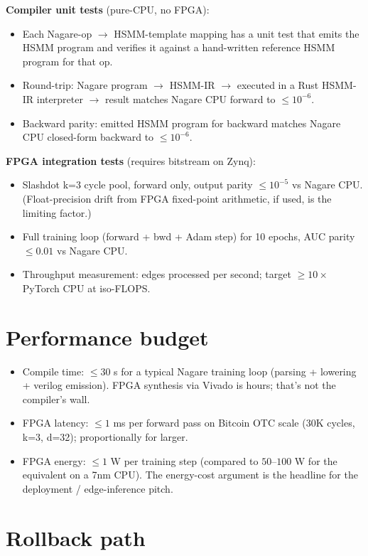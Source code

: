\documentclass[11pt]{article}
\begin{document}
\textbf{Compiler unit tests} (pure-CPU, no FPGA):
\begin{itemize}
  \item Each Nagare-op $\to$ HSMM-template mapping has a unit
    test that emits the HSMM program and verifies it against a
    hand-written reference HSMM program for that op.
  \item Round-trip: Nagare program $\to$ HSMM-IR $\to$ executed
    in a Rust HSMM-IR interpreter $\to$ result matches Nagare
    CPU forward to $\le 10^{-6}$.
  \item Backward parity: emitted HSMM program for backward
    matches Nagare CPU closed-form backward to $\le 10^{-6}$.
\end{itemize}

\textbf{FPGA integration tests} (requires bitstream on Zynq):
\begin{itemize}
  \item Slashdot k=3 cycle pool, forward only, output parity
    $\le 10^{-5}$ vs Nagare CPU. (Float-precision drift from FPGA
    fixed-point arithmetic, if used, is the limiting factor.)
  \item Full training loop (forward + bwd + Adam step) for 10
    epochs, AUC parity $\le 0.01$ vs Nagare CPU.
  \item Throughput measurement: edges processed per second; target
    $\ge 10\times$ PyTorch CPU at iso-FLOPS.
\end{itemize}

\section{Performance budget}

\begin{itemize}
  \item Compile time: $\le 30$ s for a typical Nagare training
    loop (parsing + lowering + verilog emission). FPGA synthesis
    via Vivado is hours; that's not the compiler's wall.
  \item FPGA latency: $\le 1$ ms per forward pass on Bitcoin OTC
    scale (30K cycles, k=3, d=32); proportionally for larger.
  \item FPGA energy: $\le 1$ W per training step (compared to
    $50$--$100$ W for the equivalent on a 7nm CPU). The energy-cost
    argument is the headline for the deployment / edge-inference
    pitch.
\end{itemize}

\section{Rollback path}
\end{document}
